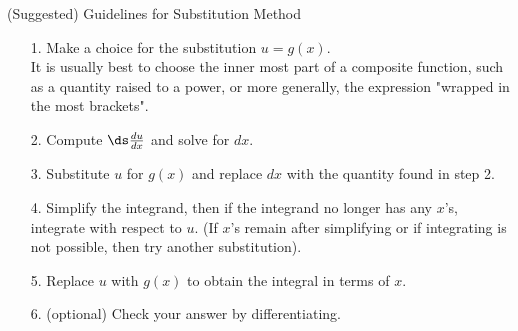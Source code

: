 \begin{frame}{(Suggested) Guidelines for Substitution Method}
\begin{itemize}
\item[1.] Make a choice for the substitution $u=g(x)$.\\
It is usually best to choose the inner most part of a composite function, such as a quantity raised to a power, or more generally, the expression "wrapped in the most brackets".\\
 \pause
\item[2.] Compute $\ds \frac{du}{dx}$ and solve for $dx$.\\ \pause 
\item[3.] Substitute $u$ for $g(x)$ and replace $dx$ with the quantity found in step 2. \pause \\
\item[4.] Simplify the integrand, then if the integrand no longer has any $x$'s, integrate with respect to $u$.  (If $x$'s remain  after simplifying or if integrating is not possible, then try another substitution).\pause \\
\item[5.] Replace $u$ with $g(x)$ to obtain the integral in terms of $x$.\pause \\
\item[6.] (optional) Check your answer  by differentiating.
\end{itemize}

\end{frame}
